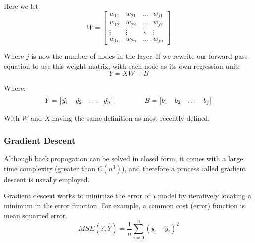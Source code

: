 \documentclass{article}
\begin{document}
    Here we let
    \begin{displaymath}
        W = \begin{bmatrix}
            w_{11} & w_{21} & \dots & w_{j1}\\
            w_{12} & w_{22} & \dots & w_{j2}\\
            \vdots & \vdots & \ddots & \vdots\\
            w_{1n} & w_{2n} & \dots & w_{jn}
        \end{bmatrix}
    \end{displaymath}

    Where $j$ is now the number of nodes in the layer. If we rewrite our forward pass equation to use this weight matrix,
    with each node as its own regression unit:
    \begin{displaymath}
        Y = XW + B
    \end{displaymath}

    Where:
    \begin{displaymath}
        Y = \begin{bmatrix}
            \hat{y_1}&
            \hat{y_2}&
            \hdots&
            \hat{y_n}
        \end{bmatrix} \hspace{15mm}
        B = \begin{bmatrix}
           b_1 & b_2 & \dots & b_j
        \end{bmatrix}
    \end{displaymath}

    With $W$ and $X$ having the same definition as most recently defined.

    

    \subsubsection{Gradient Descent}
    Although back propogation can be solved in closed form, it comes with a large time complexity (greater than $O(n^3)$), and therefore
    a process called gradient descent is usually employed.

    Gradient descent works to minimize the error of a model by iteratively locating a minimum in the error function.
    For example, a common cost (error) function is mean squarred error.
    \begin{displaymath}
        MSE(Y, \hat{Y}) = \frac{1}{n}\sum_{i=0}^{n}\left(y_i - \hat{y}_i\right)^2
    \end{displaymath}
\end{document}
